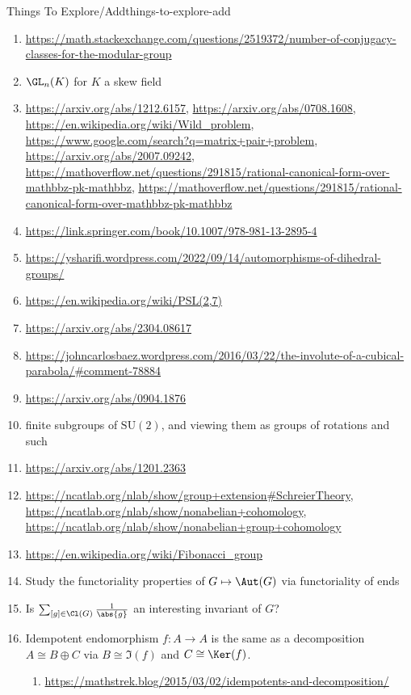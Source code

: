 \begin{remark}{Things To Explore/Add}{things-to-explore-add}
\begin{enumerate}
        \item \url{https://math.stackexchange.com/questions/2519372/number-of-conjugacy-classes-for-the-modular-group}
        \item $\GL_{n}(K)$ for $K$ a skew field
        \item \url{https://arxiv.org/abs/1212.6157}, \url{https://arxiv.org/abs/0708.1608}, \url{https://en.wikipedia.org/wiki/Wild\_problem}, \url{https://www.google.com/search?q=matrix+pair+problem}, \url{https://arxiv.org/abs/2007.09242}, \url{https://mathoverflow.net/questions/291815/rational-canonical-form-over-mathbbz-pk-mathbbz}, \url{https://mathoverflow.net/questions/291815/rational-canonical-form-over-mathbbz-pk-mathbbz}
        \item \url{https://link.springer.com/book/10.1007/978-981-13-2895-4}
        \item \url{https://ysharifi.wordpress.com/2022/09/14/automorphisms-of-dihedral-groups/}
        \item \url{https://en.wikipedia.org/wiki/PSL(2,7)}
        \item \url{https://arxiv.org/abs/2304.08617}
        \item \url{https://johncarlosbaez.wordpress.com/2016/03/22/the-involute-of-a-cubical-parabola/\#comment-78884}
        \item \url{https://arxiv.org/abs/0904.1876}
        \item finite subgroups of $\mathrm{SU}(2)$, and viewing them as groups of rotations and such
        \item \url{https://arxiv.org/abs/1201.2363}
        \item \url{https://ncatlab.org/nlab/show/group+extension#SchreierTheory}, \url{https://ncatlab.org/nlab/show/nonabelian+cohomology}, \url{https://ncatlab.org/nlab/show/nonabelian+group+cohomology}
        \item \url{https://en.wikipedia.org/wiki/Fibonacci_group}
        \item Study the functoriality properties of $G\mapsto\Aut(G)$ via functoriality of ends
        \item Is $\sum_{[g]\in\Cl(G)}\frac{1}{\abs{g}}$ an interesting invariant of $G$?
        \item Idempotent endomorphism $f\colon A\to A$ is the same as a decomposition $A\cong B\oplus C$ via $B\cong\Im(f)$ and $C\cong\Ker(f)$.
            \begin{enumerate}
                \item \url{https://mathstrek.blog/2015/03/02/idempotents-and-decomposition/}

\end{enumerate}
\end{enumerate}
\end{remark}
